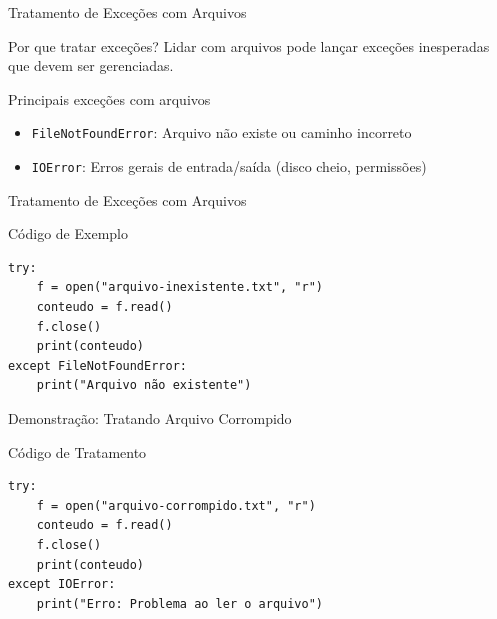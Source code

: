 



\begin{frame}[fragile]{Tratamento de Exceções com Arquivos}

\begin{block}{Por que tratar exceções?}
Lidar com arquivos pode lançar exceções inesperadas que devem ser gerenciadas.
\end{block}

\begin{block}{Principais exceções com arquivos}
\begin{itemize}
\item \texttt{FileNotFoundError}: Arquivo não existe ou caminho incorreto
\item \texttt{IOError}: Erros gerais de entrada/saída (disco cheio, permissões)
\end{itemize}
\end{block}




\end{frame}

\begin{frame}[fragile]{Tratamento de Exceções com Arquivos}

\begin{block}{Código de Exemplo}
\begin{verbatim}
try:
    f = open("arquivo-inexistente.txt", "r")
    conteudo = f.read()
    f.close()
    print(conteudo)
except FileNotFoundError:
    print("Arquivo não existente")
\end{verbatim}
\end{block}




\end{frame}

\begin{frame}[fragile]{Demonstração: Tratando Arquivo Corrompido}

\begin{block}{Código de Tratamento}
\begin{verbatim}
try:
    f = open("arquivo-corrompido.txt", "r")
    conteudo = f.read()
    f.close()
    print(conteudo)
except IOError:
    print("Erro: Problema ao ler o arquivo")
\end{verbatim}
\end{block}


\end{frame}

